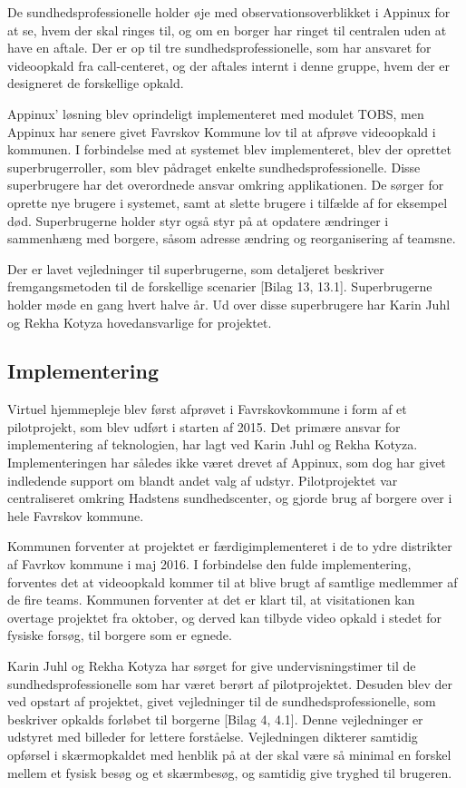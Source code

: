 De sundhedsprofessionelle holder øje med observationsoverblikket i Appinux for at se, hvem der skal ringes til, og om en borger har ringet til centralen uden at have en aftale. Der er op til tre sundhedsprofessionelle, som har ansvaret for videoopkald fra call-centeret, og der aftales internt i denne gruppe, hvem der er designeret de forskellige opkald.

Appinux' løsning blev oprindeligt implementeret med modulet TOBS, men Appinux har senere givet Favrskov Kommune lov til at afprøve videoopkald i kommunen. I forbindelse med at systemet blev implementeret, blev der oprettet superbrugerroller, som blev pådraget enkelte sundhedsprofessionelle. Disse superbrugere har det overordnede ansvar omkring applikationen. De sørger for oprette nye brugere i systemet, samt at slette brugere i tilfælde af for eksempel død. Superbrugerne holder styr også styr på at opdatere ændringer i sammenhæng med borgere, såsom adresse ændring og reorganisering af teamsne.

Der er lavet vejledninger til superbrugerne, som detaljeret beskriver fremgangsmetoden til de forskellige scenarier [Bilag 13, 13.1]. Superbrugerne holder møde en gang hvert halve år. Ud over disse superbrugere har Karin Juhl og Rekha Kotyza hovedansvarlige for projektet. 

\subsection{Implementering}
Virtuel hjemmepleje blev først afprøvet i Favrskovkommune i form af et pilotprojekt, som blev udført i starten af 2015. Det primære ansvar for implementering af teknologien, har lagt ved Karin Juhl og Rekha Kotyza. Implementeringen har således ikke været drevet af Appinux, som dog har givet indledende support om blandt andet valg af udstyr. Pilotprojektet var centraliseret omkring Hadstens sundhedscenter, og gjorde brug af borgere over i hele Favrskov kommune. 

Kommunen forventer at projektet er færdigimplementeret i de to ydre distrikter af Favrkov kommune i maj 2016. I forbindelse den fulde implementering, forventes det at videoopkald kommer til at blive brugt af samtlige medlemmer af de fire teams. Kommunen forventer at det er klart til, at visitationen kan overtage projektet fra oktober, og derved kan tilbyde video opkald i stedet for fysiske forsøg, til borgere som er egnede.

Karin Juhl og Rekha Kotyza har sørget for give undervisningstimer til de sundhedsprofessionelle som har været berørt af pilotprojektet. Desuden blev der ved opstart af projektet, givet vejledninger til de sundhedsprofessionelle, som beskriver opkalds forløbet til borgerne [Bilag 4, 4.1]. Denne vejledninger er udstyret med billeder for lettere forståelse. Vejledningen dikterer samtidig opførsel i skærmopkaldet med henblik på at der skal være så minimal en forskel mellem et fysisk besøg og et skærmbesøg, og samtidig give tryghed til brugeren.

